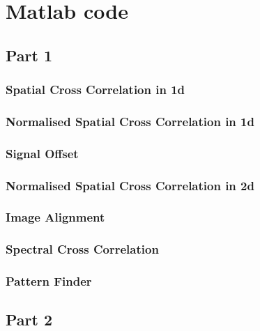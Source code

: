 \chapter{Matlab code }
\section{Part 1}
\subsection{Spatial Cross Correlation in 1d}
 \label{code:1.1_1}

\subsection{Normalised Spatial Cross Correlation in 1d}
 \label{code:1.1_2}

\subsection{Signal Offset}
 \label{code:1.2}

\subsection{Normalised Spatial Cross Correlation in 2d}
 \label{code:1.3}

\subsection{Image Alignment}
 \label{code:1.4}

\subsection{Spectral Cross Correlation}
 \label{code:1.5}

\subsection{Pattern Finder}
 \label{code:1.6}

\section{Part 2}
